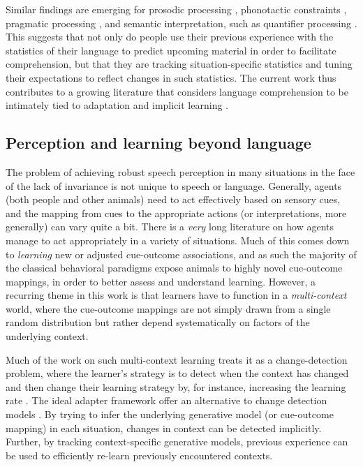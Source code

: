 Similar findings are emerging for prosodic processing \autocite{Kurumada2013}, phonotactic constraints \autocite{Chambers2010,Dell2000,Goldrick2004,Warker2006}, pragmatic processing \autocite{Grodner2011}, and semantic interpretation, such as quantifier processing \autocite{Yildirim2013}. This suggests that not only do people use their previous experience with the statistics of their language to predict upcoming material in order to facilitate comprehension, but that they are tracking situation-specific statistics and tuning their expectations to reflect changes in such statistics. The current work thus contributes to a growing literature that considers language comprehension to be intimately tied to adaptation and implicit learning \autocite[see also][]{Dell2014,Chang2006,Fine2013,Jaeger2013,Jaeger2013a,MacDonald2013}.

\subsection{Perception and learning beyond language}
\label{sec:doma-gener-perc}
\label{r4-domain-gen-learn}

The problem of achieving robust speech perception in many situations in the face of the lack of invariance is not unique to speech or language.
Generally, agents (both people and other animals) need to act effectively based on sensory cues, and the mapping from cues to the appropriate actions (or interpretations, more generally) can vary quite a bit.
There is a \emph{very} long literature on how agents manage to act appropriately in a variety of situations.  Much of this comes down to \emph{learning} new or adjusted cue-outcome associations, and as such the majority of the classical behavioral paradigms expose animals to highly novel cue-outcome mappings, in order to better assess and understand learning.
However, a recurring theme in this work is that learners have to function in  a \emph{multi-context} world, where the cue-outcome mappings are not simply drawn from a single random distribution but rather depend systematically on factors of the underlying context.  

Much of the work on such multi-context learning treats it as a change-detection problem, where the learner's strategy is to detect when the context has changed and then change their learning strategy by, for instance, increasing the learning rate \autocite[e.g.,][]{Courville2006,Gallistel2001}.
The ideal adapter framework offer an alternative to change detection models \autocite[see also related proposals discussed in][]{Qian2012}.  By trying to infer the underlying generative model (or cue-outcome mapping) in each situation, changes in context can be detected implicitly.  Further, by tracking context-specific generative models, previous experience can be used to efficiently re-learn previously encountered contexts.

